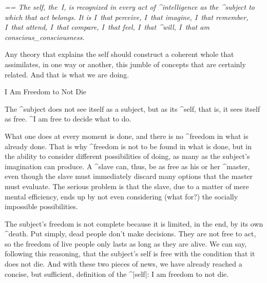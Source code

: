  \null
 {\sl\leftskip=\parindent \rightskip=\parindent \noindent
The self, the~I, is recognized in every act of ^{intelligence} as the
^{subject} to which that act belongs. It is I~that perceive, I~that
imagine, I~that remember, I~that attend, I~that compare, I~that feel,
I~that ^{will}, I~that am conscious_{consciousness}.
 \par}
 \null


\noindent
Any theory that explains the self should construct a coherent whole that
assimilates, in one way or another, this jumble of concepts that are
certainly related. And that is what we are doing.


\Section I Am Freedom to Not Die

The ^{subject} does not see itself as a subject, but as its ^{self},
that is, it sees itself as free. ^{I} am free to decide what to do.

What one does at every moment is done, and there is no ^{freedom} in
what is already done. That is why ^{freedom} is not to be found in what
is done, but in the ability to consider different possibilities of
doing, as many as the subject's imagination can produce. A ^{slave} can,
thus, be as free as his or her ^{master}, even though the slave must
immediately discard many options that the master must evaluate. The
serious problem is that the slave, due to a matter of mere mental
efficiency, ends up by not even considering (what for?) the socially
impossible possibilities.

The subject's freedom is not complete because it is limited, in the end,
by its own ^{death}. Put simply, dead people don't make decisions. They
are not free to act, so the freedom of live people only lasts as long as
they are alive. We can say, following this reasoning, that the subject's
self is free with the condition that it does not die. And with these two
pieces of news, we have already reached a concise, but sufficient,
definition of the ^|self|: I am freedom to not die.

